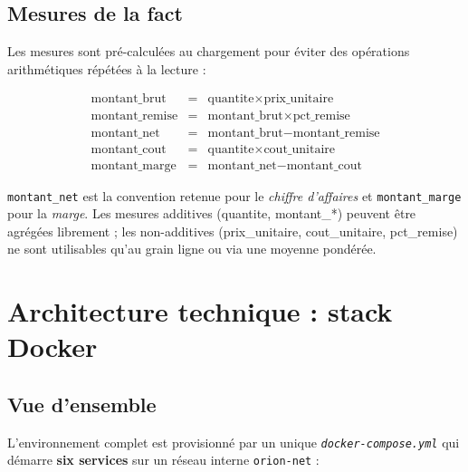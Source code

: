 \documentclass[11pt,a4paper]{article}
\newcommand{\code}[1]{\texttt{\small #1}}
\newcommand{\file}[1]{\texttt{\small\itshape #1}}
\begin{document}
\subsection{Mesures de la fact}

Les mesures sont pré-calculées au chargement pour éviter des opérations
arithmétiques répétées à la lecture :

\[
\begin{array}{rcl}
  \text{montant\_brut}   &=& \text{quantite} \times \text{prix\_unitaire}\\
  \text{montant\_remise} &=& \text{montant\_brut} \times \text{pct\_remise}\\
  \text{montant\_net}    &=& \text{montant\_brut} - \text{montant\_remise}\\
  \text{montant\_cout}   &=& \text{quantite} \times \text{cout\_unitaire}\\
  \text{montant\_marge}  &=& \text{montant\_net} - \text{montant\_cout}
\end{array}
\]

\code{montant\_net} est la convention retenue pour le \emph{chiffre d'affaires}
et \code{montant\_marge} pour la \emph{marge}. Les mesures additives
(quantite, montant\_*) peuvent être agrégées librement ; les non-additives
(prix\_unitaire, cout\_unitaire, pct\_remise) ne sont utilisables qu'au grain
ligne ou via une moyenne pondérée.

\newpage
\section{Architecture technique : stack Docker}
\label{sec:docker}

\subsection{Vue d'ensemble}

L'environnement complet est provisionné par un unique
\file{docker-compose.yml} qui démarre \textbf{six services} sur un réseau
interne \code{orion-net} :
\end{document}
